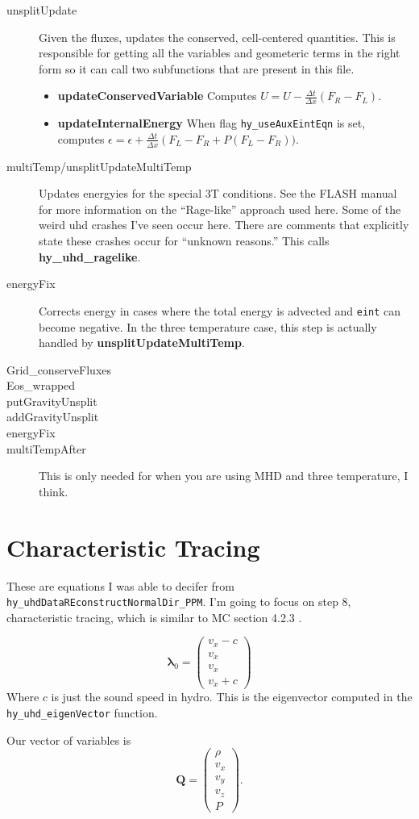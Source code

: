 \documentclass[preprint,11pt]{aastex}
\newcommand{\beq}{\begin{equation}}
\newcommand{\eeq}{\end{equation}}
\begin{document}
\begin{description}
\begin{description}
		\item[unsplitUpdate] Given the fluxes, updates the conserved, cell-centered quantities.  This is responsible for getting all the variables and geometeric terms in the right form so it can call two subfunctions that are present in this file.
		\begin{itemize}
			\item \textbf{updateConservedVariable} Computes $U = U-\frac{\Delta t}{\Delta x}\left( F_R - F_L \right)$.
			\item \textbf{updateInternalEnergy} When flag \verb!hy_useAuxEintEqn! is set, computes $\epsilon = \epsilon + \frac{\Delta t}{\Delta x} \left( F_L - F_R + P (F_L - F_R))$.
		\end{itemize}
		\item[multiTemp/unsplitUpdateMultiTemp] Updates energyies for the special 3T conditions.  See the FLASH manual for more information on the "`Rage-like"' approach used here.  Some of the weird uhd crashes I've seen occur here.  There are comments that explicitly state these crashes occur for "`unknown reasons."'  This calls \textbf{hy\_uhd\_ragelike}.
		
		\item[energyFix] Corrects energy in cases where the total energy is advected and \verb!eint! can become negative.  In the three temperature case, this step is actually handled by \textbf{unsplitUpdateMultiTemp}.
		\item[Grid\_conserveFluxes]
		\item[Eos\_wrapped]
		\item[putGravityUnsplit]
		\item[addGravityUnsplit]
		\item[energyFix]
		\item[multiTempAfter] This is only needed for when you are using MHD and three temperature, I think.

	
	\end{description}
	\end{description}

\section{Characteristic Tracing}
\label{sec:characteristic}
These are equations I was able to decifer from \verb!hy_uhdDataREconstructNormalDir_PPM!.  I'm going to focus on step $8$, characteristic tracing, which is similar to MC section 4.2.3 .

\beq
\mathbf{\lambda}_0 = \begin{pmatrix}v_x - c\\v_x \\ v_x \\ v_x + c\end{pmatrix}
\eeq
Where $c$ is just the sound speed in hydro.  This is the eigenvector computed in the \verb!hy_uhd_eigenVector! function.

Our vector of variables is
\beq
\mathbf{Q} = \begin{pmatrix}\rho\\v_x \\ v_y \\ v_z \\ P
\end{pmatrix}.
\eeq
\end{document}
